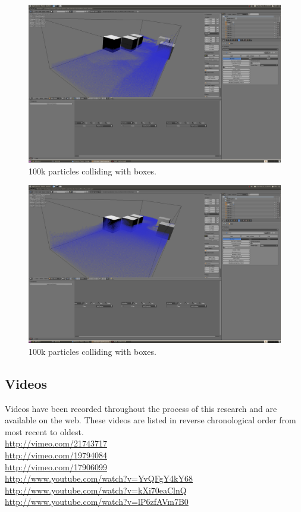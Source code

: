 \pagebreak

\begin{figure}[!htc]
		\includegraphics[scale=0.17]{figures/flood1.png}
        \caption{ 100k particles colliding with boxes. }
		\label{fig:flood1}
\end{figure}

\pagebreak
\begin{figure}[!htc]
		\includegraphics[scale=0.17]{figures/flood2.png}
        \caption{ 100k particles colliding with boxes. }
		\label{fig:flood2}
\end{figure}

\pagebreak
\clearpage

\subsection{Videos}

Videos have been recorded throughout the process of this research and are
available on the web. These videos are listed in reverse chronological order
from most recent to oldest. \\
\url{http://vimeo.com/21743717} \\
\url{http://vimeo.com/19794084} \\
\url{http://vimeo.com/17906099} \\
\url{http://www.youtube.com/watch?v=YvQFgY4kY68} \\
\url{http://www.youtube.com/watch?v=kXi70eaClnQ} \\
\url{http://www.youtube.com/watch?v=lP6zfAVm7B0} \\



